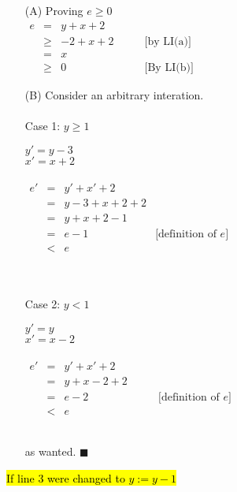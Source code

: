 \documentclass[12pt]{article}
\renewcommand{\qed}{\hfill$\blacksquare$}
\begin{document}
\hfill\begin{minipage}{\dimexpr\textwidth-10mm}
	\begin{itemize}
		\item [(A)] Proving $e \geq 0$\\
		      $\begin{array}{lcll}
				      e & =    & y + x + 2         &                   \\
				        & \geq & -2 + x + 2 \qquad & \text{[by LI(a)]} \\
				        & =    & x                 &                   \\
				        & \geq & 0                 & \text{[By LI(b)]}
			      \end{array}$
		\item [(B)] Consider an arbitrary interation.
		      \\\\
		      Case 1: $y \geq 1$

		      \hfill\begin{minipage}{\dimexpr\textwidth-20mm}
			      $y' = y-3$\qquad [line 3]\\
			      $x' = x+2$\qquad [line 3]
			      \\\\
			      $\begin{array}{lcll}
					      e' & = & y' + x' + 2     & \\
					         & = & y-3 + x + 2 + 2 & \\
					         & = & y + x + 2 - 1   & \\
					         & = & e - 1           & \text{[definition of $e$]}\\
					         & < & e               &
				      \end{array}$\\
		      \end{minipage}
		      \\\\
		      Case 2: $y < 1$

		      \hfill\begin{minipage}{\dimexpr\textwidth-20mm}
			      $y' = y$\\
			      $x' = x-2$ \qquad [line 5]
			      \\\\
			      $\begin{array}{lcll}
					      e' & = & y'+x'+2       & \\
					         & = & y + x - 2 + 2 \qquad& \\
					         & = & e-2           & \text{[definition of $e$]}\\
					         & < & e             &
				      \end{array}$\\
		      \end{minipage}\\
		      as wanted. \qed

	\end{itemize}
\end{minipage}
\newpage
\noindent \hl{If line 3 were changed to $y := y-1$}\\
\end{document}
